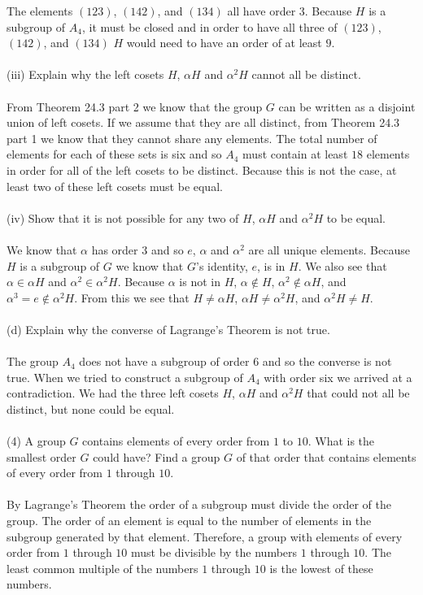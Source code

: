 \documentclass[11pt,a4paper]{article}
\begin{document}
The elements $(123)$, $(142)$, and $(134)$ all have order $3$. Because $H$ is a subgroup of $A_4$, it must be closed and in order to have all three of $(123)$, $(142)$, and $(134)$ $H$ would need to have an order of at least $9$.\\
~\\
(iii) Explain why the left cosets $H$, $\alpha H$ and $\alpha^2 H$ cannot all be distinct.\\
~\\
From Theorem 24.3 part 2 we know that the group $G$ can be written as a disjoint union of left cosets.
If we assume that they are all distinct, from Theorem 24.3 part 1 we know that they cannot share any elements. The total number of elements for each of these sets is six and so $A_4$ must contain at least $18$ elements in order for all of the left cosets to be distinct. Because this is not the case, at least two of these left cosets must be equal.\\
~\\
(iv) Show that it is not possible for any two of $H$, $\alpha H$ and $\alpha^2 H$ to be equal.\\
~\\
We know that $\alpha$ has order $3$ and so $e$, $\alpha$ and $\alpha^2$ are all unique elements. Because $H$ is a subgroup of $G$ we know that $G$'s identity, $e$, is in $H$. We also see that $\alpha \in \alpha H$ and $\alpha^2 \in \alpha^2 H$. Because $\alpha$ is not in $H$, $\alpha \notin H $, $\alpha^2 \notin \alpha H$, and $\alpha^3 = e \notin \alpha^2 H$. From this we see that $H \neq \alpha H$, $\alpha H \neq \alpha^2 H$, and $\alpha^2 H \neq H$.\\
~\\
(d) Explain why the converse of Lagrange's Theorem is not true.\\
~\\
The group $A_4$ does not have a subgroup of order $6$ and so the converse is not true. When we tried to construct a subgroup of $A_4$ with order six we arrived at a contradiction. We had the three left cosets $H$, $\alpha H$ and $\alpha^2 H$ that could not all be distinct, but none could be equal.\\
~\\
(4) A group $G$ contains elements of every order from $1$ to $10$. What is the smallest order $G$ could have? Find a group $G$ of that order that contains elements of every order from $1$ through $10$.\\
~\\
By Lagrange's Theorem the order of a subgroup must divide the order of the group. The order of an element is equal to the number of elements in the subgroup generated by that element. Therefore, a group with elements of every order from $1$ through $10$ must be divisible by the numbers $1$ through $10$. The least common multiple of the numbers $1$ through $10$ is the lowest of these numbers.
\end{document}
